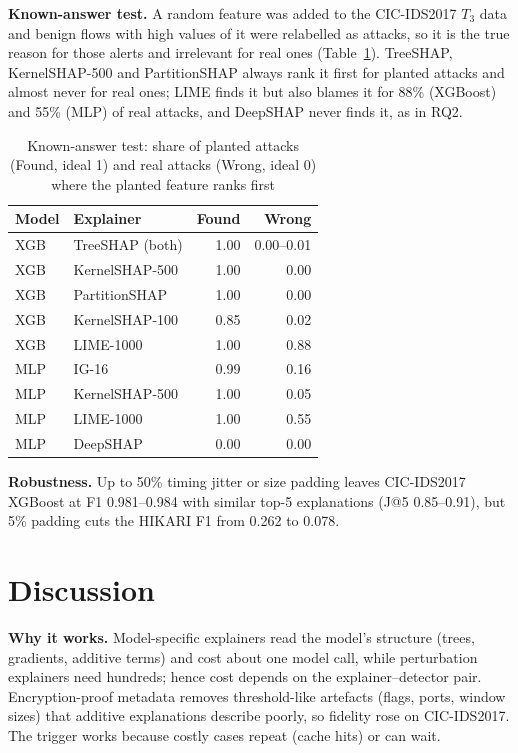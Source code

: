 \documentclass[pdflatex,iicol,sn-mathphys-num]{sn-jnl}
\begin{document}
\textbf{Known-answer test.} A random feature was added to the CIC-IDS2017 $T_3$ data and benign flows with high values of it were relabelled as attacks, so it is the true reason for those alerts and irrelevant for real ones (Table~\ref{tab:sanity}). TreeSHAP, KernelSHAP-500 and PartitionSHAP always rank it first for planted attacks and almost never for real ones; LIME finds it but also blames it for 88\% (XGBoost) and 55\% (MLP) of real attacks, and DeepSHAP never finds it, as in RQ2.

\begin{table}[!t]
\caption{Known-answer test: share of planted attacks (Found, ideal 1) and real attacks (Wrong, ideal 0) where the planted feature ranks first}\label{tab:sanity}
\setlength{\tabcolsep}{2pt}
\begin{tabular*}{\columnwidth}{@{\extracolsep\fill}llrr@{}}
\toprule
Model & Explainer & Found & Wrong \\
\midrule
XGB & TreeSHAP (both) & 1.00 & 0.00--0.01 \\
XGB & KernelSHAP-500 & 1.00 & 0.00 \\
XGB & PartitionSHAP & 1.00 & 0.00 \\
XGB & KernelSHAP-100 & 0.85 & 0.02 \\
XGB & LIME-1000 & 1.00 & 0.88 \\
MLP & IG-16 & 0.99 & 0.16 \\
MLP & KernelSHAP-500 & 1.00 & 0.05 \\
MLP & LIME-1000 & 1.00 & 0.55 \\
MLP & DeepSHAP & 0.00 & 0.00 \\
\bottomrule
\end{tabular*}
\end{table}

\textbf{Robustness.} Up to 50\% timing jitter or size padding leaves CIC-IDS2017 XGBoost at F1 0.981--0.984 with similar top-5 explanations (J@5 0.85--0.91), but 5\% padding cuts the HIKARI F1 from 0.262 to 0.078.

\section{Discussion}\label{sec:discussion}

\textbf{Why it works.} Model-specific explainers read the model's structure (trees, gradients, additive terms) and cost about one model call, while perturbation explainers need hundreds; hence cost depends on the explainer--detector pair. Encryption-proof metadata removes threshold-like artefacts (flags, ports, window sizes) that additive explanations describe poorly, so fidelity rose on CIC-IDS2017. The trigger works because costly cases repeat (cache hits) or can wait.
\end{document}
